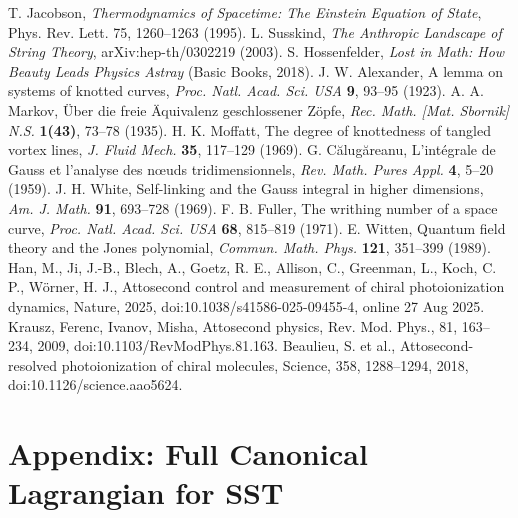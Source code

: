 \documentclass[10pt,reprint,aps,onecolumn,nofootinbib]{revtex4-2}
\begin{document}
\begin{thebibliography}{99}
     T. Jacobson, \emph{Thermodynamics of Spacetime: The Einstein Equation of State}, Phys. Rev. Lett. 75, 1260–1263 (1995).
     L. Susskind, \emph{The Anthropic Landscape of String Theory}, arXiv:hep-th/0302219 (2003).
     S. Hossenfelder, \emph{Lost in Math: How Beauty Leads Physics Astray} (Basic Books, 2018).
     J. W. Alexander, A lemma on systems of knotted curves, \emph{Proc. Natl. Acad. Sci. USA} \textbf{9}, 93–95 (1923).
     A. A. Markov, Über die freie Äquivalenz geschlossener Zöpfe, \emph{Rec. Math. [Mat. Sbornik] N.S.} \textbf{1(43)}, 73–78 (1935).
     H. K. Moffatt, The degree of knottedness of tangled vortex lines, \emph{J. Fluid Mech.} \textbf{35}, 117–129 (1969).
     G. Călugăreanu, L’intégrale de Gauss et l’analyse des nœuds tridimensionnels, \emph{Rev. Math. Pures Appl.} \textbf{4}, 5–20 (1959).
     J. H. White, Self-linking and the Gauss integral in higher dimensions, \emph{Am. J. Math.} \textbf{91}, 693–728 (1969).
     F. B. Fuller, The writhing number of a space curve, \emph{Proc. Natl. Acad. Sci. USA} \textbf{68}, 815–819 (1971).
     E. Witten, Quantum field theory and the Jones polynomial, \emph{Commun. Math. Phys.} \textbf{121}, 351–399 (1989).
     Han, M., Ji, J.-B., Blech, A., Goetz, R. E., Allison, C., Greenman, L., Koch, C. P., W\"orner, H. J., Attosecond control and measurement of chiral photoionization dynamics, Nature, 2025, doi:10.1038/s41586-025-09455-4, online 27 Aug 2025.
     Krausz, Ferenc, Ivanov, Misha, Attosecond physics, Rev. Mod. Phys., 81, 163--234, 2009, doi:10.1103/RevModPhys.81.163.
     Beaulieu, S. et al., Attosecond-resolved photoionization of chiral molecules, Science, 358, 1288--1294, 2018, doi:10.1126/science.aao5624.



    \end{thebibliography}

    \appendix

\section{Appendix: Full Canonical Lagrangian for SST}
\label{app:fullL}
\end{document}
